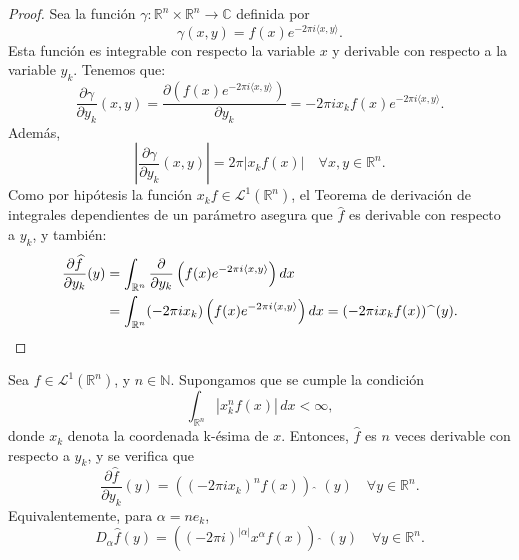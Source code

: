 \begin{proof}
\noindent Sea la función $\gamma : \mathbb{R}^n \times \mathbb{R}^n \rightarrow \mathbb{C}$ definida por 
\begin{equation}
    \gamma(x,y) = 
     f(x) e^{-2\pi i \langle x, y \rangle}.
\end{equation}
Esta función es integrable con respecto la variable $x$ y derivable con respecto a la variable $y_k$.
Tenemos que:
\begin{equation}
    \frac{\partial \gamma}{\partial y_k}(x,y) = \frac{\partial \left(f(x) e^{-2\pi i \langle x, y \rangle}\right)}{\partial y_k} = -2 \pi  i x_k f(x) e^{-2\pi i \langle x, y \rangle}. 
\end{equation}
Además,
\begin{equation}
    \left|\frac{\partial \gamma}{\partial y_k}(x,y)\right| = 2 \pi   |x_k f(x)| \quad \forall x,y \in \mathbb{R}^n.
\end{equation}
Como por hipótesis la función $x_kf \in \mathscr{L}^1(\mathbb{R}^n)$, el Teorema de derivación de integrales dependientes de un parámetro asegura que $\widehat{f}$ es derivable con respecto a $y_k$, y también:
 \begin{align}
    \frac{\partial \widehat{f}}{\partial y_k}(y) &= \int_{\mathbb{R}^n}\frac {\partial}{\partial y_k}\left(f(x) e^{-2\pi i \langle x, y \rangle}\right)dx \\ &= \int_{\mathbb{R}^n} (-2 \pi i x_k) \left(f(x) e^{-2\pi i \langle x, y \rangle}\right)dx  =
     (-2 \pi ix_k f (x))\,\,\widehat{  } \,\, (y).\qedhere
\end{align}
\end{proof}

\begin{corolario}\label{coro:deri2}
Sea 
   $f \in \mathscr{L}^1(\mathbb{R}^n)$, y $n \in \mathbb{N}$. Supongamos que se cumple la condición 
   \begin{equation}\int_{\mathbb{R}^n}|x_{k}^{n}f(x)| \, dx < \infty,
   \end{equation}
   donde $x_k$ denota la coordenada k-ésima de $x$.
   Entonces, $\widehat{f}$ es $n$ veces derivable con respecto a $y_k$, y se verifica que
   \begin{equation}\label{eq:ecuacion}
    \frac{\partial \widehat{f}}{\partial y_k}(y) = ((-2 \pi ix_k)^nf(x))\,\,\widehat{  } \,\, (y) \quad \forall  y \in \mathbb{R}^n.
   \end{equation}
    Equivalentemente, para $\alpha = ne_k $,
   \begin{equation}
     D_{\alpha}\widehat{f}(y) = ((-2 \pi i)^{|\alpha|}x^{\alpha} f (x))\,\,\widehat{  } \,\, (y) \quad \forall  y \in \mathbb{R}^n.
   \end{equation}
\end{corolario}





